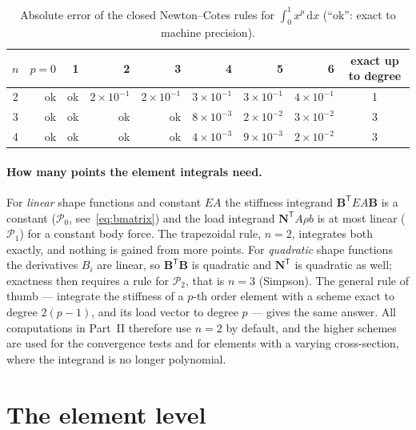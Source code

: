\documentclass[11pt,a4paper]{article}
\numberwithin{equation}{section}
\theoremstyle{remark}
\newcommand{\bN}{\bm{N}}
\newcommand{\bB}{\bm{B}}
\begin{document}
\begin{table}[ht]
  \centering
  \caption{Absolute error of the closed Newton--Cotes rules for $\int_0^1 x^p\,\mathrm{d}x$
    (``ok'': exact to machine precision).}
  \label{tab:ncerr}
  \begin{tabular}{crrrrrrrc}
    \toprule
    $n$ & $p=0$ & 1 & 2 & 3 & 4 & 5 & 6 & exact up to degree \\
    \midrule
    2 & ok & ok & $2\times10^{-1}$ & $2\times10^{-1}$ & $3\times10^{-1}$ & $3\times10^{-1}$ & $4\times10^{-1}$ & 1 \\
    3 & ok & ok & ok & ok & $8\times10^{-3}$ & $2\times10^{-2}$ & $3\times10^{-2}$ & 3 \\
    4 & ok & ok & ok & ok & $4\times10^{-3}$ & $9\times10^{-3}$ & $2\times10^{-2}$ & 3 \\
    \bottomrule
  \end{tabular}
\end{table}

\paragraph{How many points the element integrals need.}
For \emph{linear} shape functions and constant $EA$ the stiffness integrand
$\bB^{\mathsf{T}}EA\bB$ is a constant ($\mathcal{P}_0$, see~\eqref{eq:bmatrix}) and the
load integrand $\bN^{\mathsf{T}}A\rho b$ is at most linear ($\mathcal{P}_1$) for a constant
body force. The trapezoidal rule, $n = 2$, integrates both exactly, and nothing is gained
from more points. For \emph{quadratic} shape functions the derivatives $B_i$ are linear, so
$\bB^{\mathsf{T}}\bB$ is quadratic and $\bN^{\mathsf{T}}$ is quadratic as well; exactness
then requires a rule for $\mathcal{P}_2$, that is $n = 3$ (Simpson). The general rule of
thumb --- integrate the stiffness of a $p$-th order element with a scheme exact to degree
$2(p-1)$, and its load vector to degree $p$ --- gives the same answer. All computations in
Part~II therefore use $n = 2$ by default, and the higher schemes are used for the
convergence tests and for elements with a varying cross-section, where the integrand is no
longer polynomial.

\section{The element level}\label{sec:element}
\end{document}
